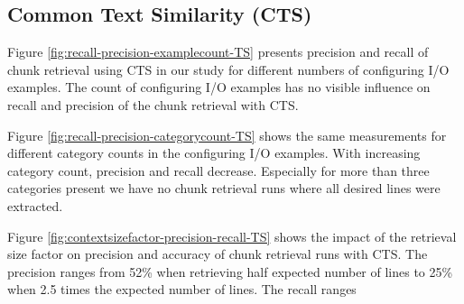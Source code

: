 \documentclass[\myrootdir/main.tex]{subfiles}
\begin{document}
\subsection{Common Text Similarity (CTS)}
Figure \ref{fig:recall-precision-examplecount-TS} presents precision and recall of chunk retrieval using CTS in our study for different numbers of configuring I/O examples.
The count of configuring I/O examples has no visible influence on recall and precision of the chunk retrieval with CTS.

Figure \ref{fig:recall-precision-categorycount-TS} shows the same measurements for different category counts in the configuring I/O examples.
With increasing category count, precision and recall decrease.
Especially for more than three categories present we have no chunk retrieval runs where all desired lines were extracted.

Figure \ref{fig:contextsizefactor-precision-recall-TS} shows the impact of the retrieval size factor on precision and accuracy of chunk retrieval runs with CTS.
The precision ranges from 52\% when retrieving half expected number of lines to 25\% when 2.5 times the expected number of lines.
The recall ranges


\end{document}
